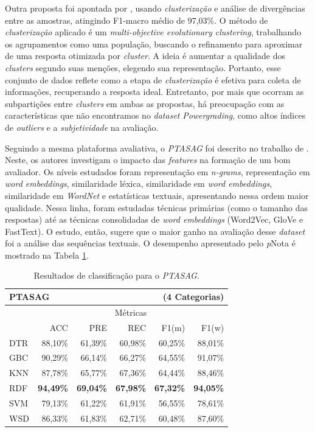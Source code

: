 Outra proposta foi apontada por \cite{lui2022}, usando \textit{clusterização} e análise de divergências entre as amostras, atingindo F1-macro médio de 97,03\%. O método de \textit{clusterização} aplicado é um \textit{multi-objective evolutionary clustering}, trabalhando os agrupamentos como uma população, buscando o refinamento para aproximar de uma resposta otimizada por \textit{cluster}. A ideia é aumentar a qualidade dos \textit{clusters} segundo suas menções, elegendo sua representação. Portanto, esse conjunto de dados reflete como a etapa de \textit{clusterização} é efetiva para coleta de informações, recuperando a resposta ideal. Entretanto, por mais que ocorram as subpartições entre \textit{clusters} em ambas as propostas, há preocupação com as características que não encontramos no \textit{dataset} \textit{Powergrading}, como altos índices de \textit{outliers} e a \textit{subjetividade} na avaliação.

Seguindo a mesma plataforma avaliativa, o \textit{PTASAG} foi descrito no trabalho de \cite{galhardi2020}. Neste, os autores investigam o impacto das \textit{features} na formação de um bom avaliador. Os níveis estudados foram representação em \textit{n-grams}, representação em \textit{word embeddings}, similaridade léxica, similaridade em \textit{word embeddings}, similaridade em \textit{WordNet} e estatísticas textuais, apresentando nessa ordem maior qualidade. Nessa linha, foram estudadas técnicas primárias (como o tamanho das respostas) até as técnicas consolidadas de \textit{word embeddings} (Word2Vec, GloVe e FastText). O estudo, então, sugere que o maior ganho na avaliação desse \textit{dataset} foi a análise das sequências textuais. O desempenho apresentado pelo \textit{p}Nota é mostrado na Tabela \ref{tab-PTASAG}.

\begin{table}[!h]
\centering
\caption{Resultados de classificação para o \textit{PTASAG}.}
\label{tab-PTASAG}
\begin{tabular}{l r r r r r}
    \hline
    \multicolumn{4}{l}{\textbf{PTASAG}} & \multicolumn{2}{r}{(4 Categorias)} \\ \hline
     & \multicolumn{5}{c}{M{\'e}tricas} \\ \cline{2-6}

     & ACC & PRE & REC & F1(m) & F1(w) \\ \cline{2-6}
    DTR & 88,10\% & 61,39\% & 60,98\% & 60,25\% & 88,01\% \\
    GBC & 90,29\% & 66,14\% & 66,27\% & 64,55\% & 91,07\% \\
    KNN & 87,78\% & 65,77\% & 67,36\% & 64,44\% & 88,46\% \\
    RDF & \textbf{94,49\%} & \textbf{69,04\%} & \textbf{67,98\%} & \textbf{67,32\%} & \textbf{94,05\%} \\
    SVM & 79,13\% & 61,22\% & 61,91\% & 56,55\% & 78,61\% \\
    WSD & 86,33\% & 61,83\% & 62,71\% & 60,48\% & 87,60\% \\

    \hline
    \hline
\end{tabular}
\end{table}

